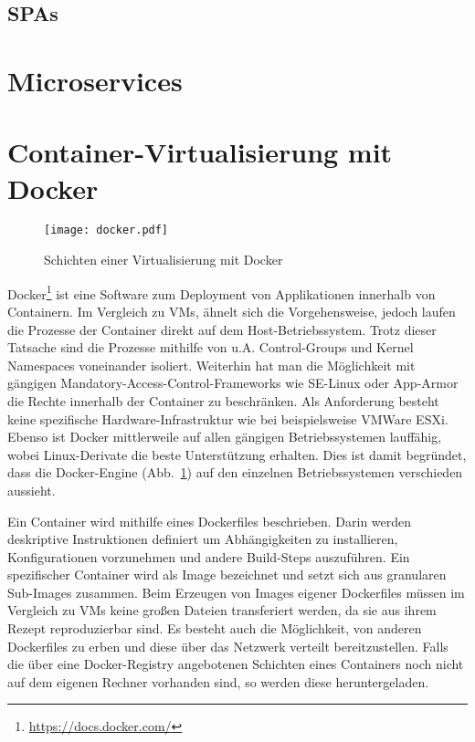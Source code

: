 \subsection{\aclp{SPA}}
\blindtext
\section{Microservices}
\blindtext
\section{Container-Virtualisierung mit Docker}
\begin{figure}
  \centering
  \texttt{[image: docker.pdf]}
  \par
  \caption{Schichten einer Virtualisierung mit Docker}
  \label{fig:layers-docker}
\end{figure}
Docker\footnote{\url{https://docs.docker.com/}} ist eine Software zum Deployment von Applikationen innerhalb von Containern.
Im Vergleich zu \acp{VM}, ähnelt sich die Vorgehensweise, jedoch laufen die Prozesse der Container direkt auf dem Host-Betriebssystem.
Trotz dieser Tatsache sind die Prozesse mithilfe von \ac{u.A.} Control-Groups und Kernel Namespaces voneinander isoliert.
Weiterhin hat man die Möglichkeit mit gängigen Mandatory-Access-Control-Frameworks wie SE-Linux oder App-Armor die Rechte innerhalb der Container zu beschränken.
Als Anforderung besteht keine spezifische Hardware-Infrastruktur wie bei beispielsweise VMWare ESXi.
Ebenso ist Docker mittlerweile auf allen gängigen Betriebssystemen lauffähig, wobei Linux-Derivate die beste Unterstützung erhalten.
Dies ist damit begründet, dass die Docker-Engine (\ac{Abb.}~\ref{fig:layers-docker}) auf den einzelnen Betriebssystemen verschieden aussieht.
\par
Ein Container wird mithilfe eines Dockerfiles beschrieben.
Darin werden deskriptive Instruktionen definiert um Abhängigkeiten zu installieren, Konfigurationen vorzunehmen und andere Build-Steps auszuführen.
Ein spezifischer Container wird als Image bezeichnet und setzt sich aus granularen Sub-Images zusammen.
Beim Erzeugen von Images eigener Dockerfiles müssen im Vergleich zu \acp{VM} keine großen Dateien transferiert werden, da sie aus ihrem Rezept reproduzierbar sind. 
Es besteht auch die Möglichkeit, von anderen Dockerfiles zu erben und diese über das Netzwerk verteilt bereitzustellen.
Falls die über eine Docker-Registry angebotenen Schichten eines Containers noch nicht auf dem eigenen Rechner vorhanden sind, so werden diese heruntergeladen.
